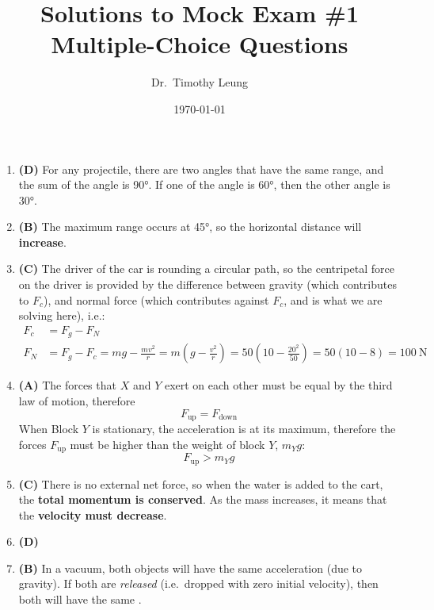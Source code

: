 \documentclass{../../oss-handout}
\title{Solutions to Mock Exam \#1 Multiple-Choice Questions}
\author{Dr.\ Timothy Leung}
\date{\today}
\begin{document}
\thispagestyle{title}
\gentitle

\begin{enumerate}[leftmargin=17pt]
\item\textbf{(D)} For any projectile, there are two angles that have the same
  range, and the sum of the angle is \ang{90}. If one of the angle is \ang{60},
  then the other angle is \ang{30}.

\item\textbf{(B)} The maximum range occurs at \ang{45}, so the horizontal
  distance will \textbf{increase}.

\item\textbf{(C)} The driver of the car is rounding a circular path, so the
  centripetal force on the driver is provided by the difference between gravity
  (which contributes to $F_c$), and normal force (which contributes against
  $F_c$, and is what we are solving here), i.e.:
  \begin{align*}
    F_c &= F_g - F_N\\
    F_N &= F_g - F_c= mg- \frac{mv^2}{r}=m\left( g- \frac{v^2}{r}\right)=
    50\left(10-\frac{20^2}{50}\right)=50(10-8)=\boxed{\SI{100}{\newton}}
  \end{align*}

\item\textbf{(A)} The forces that $X$ and $Y$ exert on each other must be equal
  by the third law of motion, therefore
  \begin{equation*}
    \boxed{F_\text{up}=F_\text{down}}
  \end{equation*}
  When Block $Y$ is stationary, the acceleration is at its maximum, therefore
  the forces $F_\text{up}$ must be higher than the weight of block $Y$, $m_Yg$:
  \begin{equation*}
    \boxed{F_\text{up}>m_Yg}
  \end{equation*}
  
\item\textbf{(C)} There is no external net force, so when the water is added to
  the cart, the \textbf{total momentum is conserved}. As the mass increases, it
  means that the \textbf{velocity must decrease}.

\item\textbf{(D)}

\item\textbf{(B)} In a vacuum, both objects will have the same acceleration
  (due to gravity). If both are \emph{released} (i.e.\ dropped with zero
  initial velocity), then both will have the same .


\end{enumerate}
\end{document}
